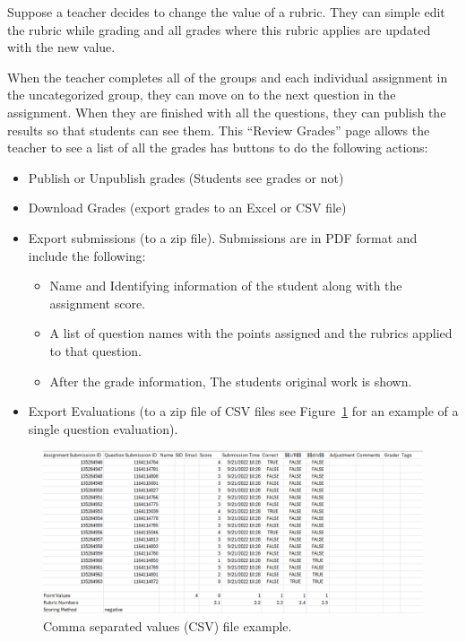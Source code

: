 \documentclass[ms,twoside,print]{nuthesis}
\begin{document}
Suppose a teacher decides to change the value of a rubric. They can simple edit the rubric while grading and all grades where this rubric applies are updated with the new value.

When the teacher completes all of the groups and each individual assignment in the uncategorized group, they can move on to the next question in the assignment. When they are finished with all the questions, they can publish the results so that students can see them. This ``Review Grades'' page allows the teacher to see a list of all the grades has buttons to do the following actions:

\begin{itemize}
    \item Publish or Unpublish grades (Students see grades or not)
    \item Download Grades (export grades to an Excel or CSV file)
    \item Export submissions (to a zip file). Submissions are in PDF format and include the following:
    \begin{itemize}
        \item Name and Identifying information of the student along with the assignment score.
        \item A list of question names with the points assigned and the rubrics applied to that question. 
        \item After the grade information, The students original work is shown.
    \end{itemize}
    \item Export Evaluations (to a zip file of CSV files see Figure~\ref{fig:evaluation-export} for an example of a single question evaluation). 
\end{itemize}

\begin{figure}[htb]
    \centering
    \includegraphics[width=\textwidth]{images/evaluation-exports.png}
    \caption{Comma separated values (CSV) file example.}\label{fig:evaluation-export}
\end{figure}
\end{document}
